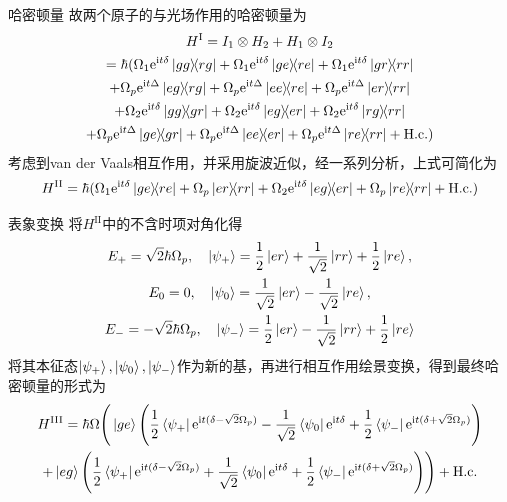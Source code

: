 \documentclass[10pt,aspectratio=43]{beamer}
\begin{document}
\begin{frame}{哈密顿量}
故两个原子的与光场作用的哈密顿量为
\begin{multline}
H^\mathrm{I}=I_1\otimes H_2+H_1\otimes I_2\\
=\hbar(\Omega_1\mathrm{e}^{\mathrm{i}t\delta}\ketbra{gg}{rg}
+\Omega_1\mathrm{e}^{\mathrm{i}t\delta}\ketbra{ge}{re}
+\Omega_1\mathrm{e}^{\mathrm{i}t\delta}\ketbra{gr}{rr}\\
+\Omega_p\mathrm{e}^{\mathrm{i}t\Delta}\ketbra{eg}{rg}
+\Omega_p\mathrm{e}^{\mathrm{i}t\Delta}\ketbra{ee}{re}
+\Omega_p\mathrm{e}^{\mathrm{i}t\Delta}\ketbra{er}{rr}\\
+\Omega_2\mathrm{e}^{\mathrm{i}t\delta}\ketbra{gg}{gr}
+\Omega_2\mathrm{e}^{\mathrm{i}t\delta}\ketbra{eg}{er}
+\Omega_2\mathrm{e}^{\mathrm{i}t\delta}\ketbra{rg}{rr}\\
+\Omega_p\mathrm{e}^{\mathrm{i}t\Delta}\ketbra{ge}{gr}
+\Omega_p\mathrm{e}^{\mathrm{i}t\Delta}\ketbra{ee}{er}
+\Omega_p\mathrm{e}^{\mathrm{i}t\Delta}\ketbra{re}{rr}
+\mathrm{H.c.})
\end{multline}
考虑到van der Vaals相互作用，并采用旋波近似，经一系列分析，上式可简化为
\begin{equation}
H^{\mathrm{II}}=\hbar(\Omega_1\mathrm{e}^{\mathrm{i}t \delta}\ketbra{ge}{re}
+\Omega_p\ketbra{er}{rr}
+\Omega_2\mathrm{e}^{\mathrm{i}t \delta}\ketbra{eg}{er}
+\Omega_p\ketbra{re}{rr}+\mathrm{H.c.})
\end{equation}

\end{frame}
\begin{frame}{表象变换}
将$ H^{\mathrm{II}} $中的不含时项对角化得
{\small\begin{equation}
\begin{gathered}
E_+=\sqrt{2}\hbar\Omega_p,\quad\ket{\psi_+}=\frac{1}{2}\ket{er}+\frac{1}{\sqrt{2}}\ket{rr}+\frac{1}{2}\ket{re},\\
E_0=0,\quad\ket{\psi_0}=\frac{1}{\sqrt{2}}\ket{er}-\frac{1}{\sqrt{2}}\ket{re},\\
E_-=-\sqrt{2}\hbar\Omega_p,\quad\ket{\psi_-}=\frac{1}{2}\ket{er}-\frac{1}{\sqrt{2}}\ket{rr}+\frac{1}{2}\ket{re}
\end{gathered}
\end{equation}}
将其本征态$ \ket{\psi_+},\ket{\psi_0},\ket{\psi_-} $作为新的基，再进行相互作用绘景变换，得到最终哈密顿量的形式为
{\small\begin{multline}\label{hiii}
H^{\mathrm{III}}=\hbar\Omega\Bigg(\ket{ge}\Bigg(\frac{1}{2}\bra{\psi_+}\mathrm{e}^{\mathrm{i}t(\delta-\sqrt{2}\Omega_p)}-\frac{1}{\sqrt{2}}\bra{\psi_0}\mathrm{e}^{\mathrm{i}t \delta}+\frac{1}{2}\bra{\psi_-}\mathrm{e}^{\mathrm{i}t (\delta+\sqrt{2}\Omega_p)}\Bigg)\\
+\ket{eg}\Bigg(\frac{1}{2}\bra{\psi_+}\mathrm{e}^{\mathrm{i}t(\delta-\sqrt{2}\Omega_p)}+\frac{1}{\sqrt{2}}\bra{\psi_0}\mathrm{e}^{\mathrm{i}t \delta}+\frac{1}{2}\bra{\psi_-}\mathrm{e}^{\mathrm{i}t (\delta+\sqrt{2}\Omega_p)}\Bigg)\Bigg)+\mathrm{H.c.}
\end{multline}}
\end{frame}
\end{document}
